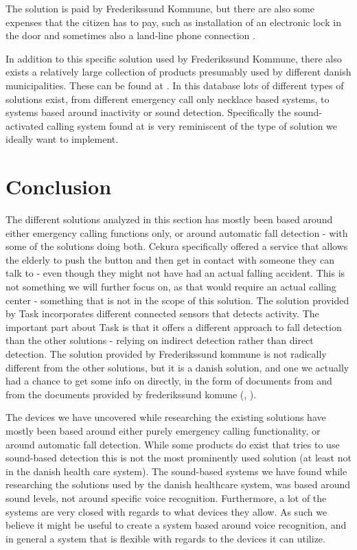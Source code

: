The solution is paid by Frederikssund Kommune, but there are also some expenses that the citizen has to pay, such as installation of an electronic lock in the door and sometimes also a land-line phone connection \cite{frederikssund:arbejdesbeskrivelse} \cite{frederikssund:kvalitetsstandard}.

In addition to this specific solution used by Frederikssund Kommune, there also exists a relatively large collection of products presumably used by different danish municipalities.
These can be found at \cite{hmi}. In this database lots of different types of solutions exist, from different emergency call only necklace based systems, to systems based around inactivity or sound detection. Specifically the sound-activated calling system found at \cite{hmilak} is very reminiscent of the type of solution we ideally want to implement.

\section{Conclusion}
The different solutions analyzed in this section has mostly been based around either emergency calling functions only, or around automatic fall detection - with some of the solutions doing both.
Cekura specifically offered a service that allows the elderly to push the button and then get in contact with someone they can talk to - even though they might not have had an actual falling accident. This is not something we will further focus on, as that would require an actual calling center - something that is not in the scope of this solution. 
The solution provided by Task incorporates different connected sensors that detects activity. The important part about Task is that it offers a different approach to fall detection than the other solutions - relying on indirect detection rather than direct detection.
The solution provided by Frederikssund kommune is not radically different from the other solutions, but it is a danish solution, and one we actually had a chance to get some info on directly, in the form of documents from \cite{hmi} and from the documents provided by frederikssund komune (\cite{frederikssund:arbejdesbeskrivelse}, \cite{frederikssund:kvalitetsstandard}).

The devices we have uncovered while researching the existing solutions have mostly been based around either purely emergency calling functionality, or around automatic fall detection.
While some products do exist that tries to use sound-based detection this is not the most prominently used solution (at least not in the danish health care system). The sound-based systems we have found while researching the solutions used by the danish healthcare system, was based around sound levels, not around specific voice recognition. Furthermore, a lot of the systems are very closed with regards to what devices they allow. As such we believe it might be useful to create a system based around voice recognition, and in general a system that is flexible with regards to the devices it can utilize.

